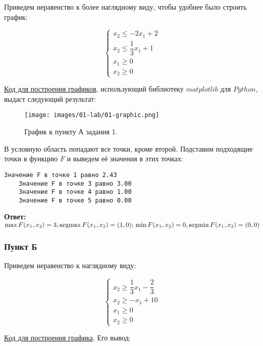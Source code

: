 Приведем неравенство к более наглядному виду, чтобы удобнее было строить график:

\[
    \begin{cases}
        x_2 \leq -2x_1 + 2\\
        x_2 \leq \dfrac{1}{3}x_1 + 1\\
        x_1 \geq 0\\
        x_2 \geq 0
    \end{cases}
\]

\href{https://github.com/retrobannerS/optimization_methods/blob/main/python/01-lab/A.%2001.py}{Код для построения графиков}, использующий библиотеку $matplotlib$ для $Python$, выдаст следующий результат:
\begin{figure}[H]
    \texttt{[image: images/01-lab/01-graphic.png]}
    \caption{График к пункту А задания 1.}
    \label{01-lab-01-graphic}
\end{figure}

В условную область попадают все точки, кроме второй. Подставим подходящие точки в функцию $F$ и выведем её значения в этих точках:

\begin{lstlisting}[language=text]
    Значение F в точке 1 равно 2.43
    Значение F в точке 3 равно 3.00
    Значение F в точке 4 равно 1.00
    Значение F в точке 5 равно 0.00
\end{lstlisting}

\textbf{Ответ:} $\max F(x_1, x_2) = 3, \operatorname*{argmax} F(x_1, x_2) = (1, 0);\\
\min F(x_1, x_2) = 0, \operatorname*{argmin} F(x_1, x_2) = (0, 0)$ \label{01-lab-a-answer}

\subsubsection{Пункт Б}\label{01-lab-b}

Приведем неравенство к наглядному виду:

\[
    \begin{cases}
        x_2 \geq \dfrac{1}{3} x_1 - \dfrac{2}{3}\\
        x_2 \geq -x_1 + 10\\
        x_1 \geq 0\\
        x_2 \geq 0
    \end{cases}
\]

\href{https://github.com/retrobannerS/optimization_methods/blob/main/python/01-lab/B.%2001.py}{Код для построения графика}. Его вывод:

